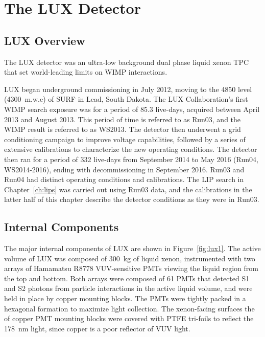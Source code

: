\chapter{The LUX Detector}

\label{ch:lux} %




\section{LUX Overview}
The \ac{LUX} detector was an ultra-low background dual phase liquid xenon \ac{TPC} that set world-leading limits on \ac{WIMP} interactions.
 
\ac{LUX} began underground commissioning in July 2012, moving to the 4850 level (4300~m.w.e) of \ac{SURF} in Lead, South Dakota.  The \ac{LUX} Collaboration's first \ac{WIMP} search exposure was for a period of 85.3 live-days, acquired between April 2013 and August 2013. This period of time is referred to as Run03, and the \ac{WIMP} result is referred to as WS2013. The detector then underwent a grid conditioning campaign to improve voltage capabilities, followed by a series of extensive calibrations to characterize the new operating conditions. The detector then ran for a period of 332 live-days from September 2014 to May 2016 (Run04, WS2014-2016), ending with decommissioning in September 2016. Run03 and Run04 had distinct operating conditions and calibrations. The \ac{LIP} search in Chapter~\ref{ch:lips} was carried out using Run03 data, and the calibrations in the latter half of this chapter describe the detector conditions as they were in Run03. 

\section{Internal Components}
The major internal components of \ac{LUX} are shown in Figure~\ref{fig:lux1}. The active volume of \ac{LUX} was composed of 300~kg of liquid xenon, instrumented with two arrays of Hamamatsu R8778 \ac{VUV}-sensitive \ac{PMT}s viewing the liquid region from the top and bottom. Both arrays were composed of 61 \ac{PMT}s that detected S1 and S2 photons from particle interactions in the active liquid volume, and were held in place by copper mounting blocks. The \ac{PMT}s were tightly packed in a hexagonal formation to maximize light collection. The xenon-facing surfaces the of copper \ac{PMT} mounting blocks were covered with \ac{PTFE} tri-foils to reflect the 178~nm light, since copper is a poor reflector of \ac{VUV} light. 

